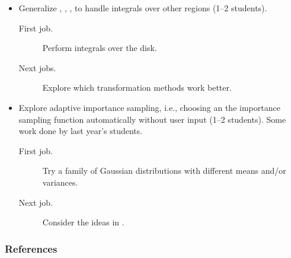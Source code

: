 \documentclass[10pt,compress,xcolor={usenames,dvipsnames}]{beamer} %
\begin{document}
\begin{frame}[allowframebreaks]
\begin{itemize}
\pagebreak

\item Generalize , , , to handle integrals over other regions (1--2 students).
\begin{description}
\item[First job.] Perform integrals over the disk.
\item[Next jobs.]  Explore which transformation methods work better. 
\end{description}


\item Explore adaptive importance sampling, i.e., choosing an the importance sampling function automatically without user input (1--2 students).  Some work done by last year's students.
\begin{description}
\item[First job.] Try a family of Gaussian distributions with different means and/or variances.
\item[Next job.] Consider the ideas in .
\end{description}

\end{itemize}
\end{frame}


\begin{frame}\frametitle{References}

\end{frame}
\end{document}
